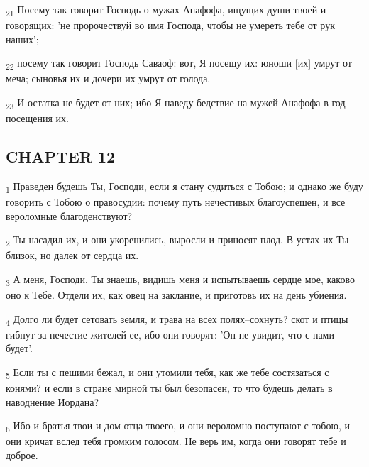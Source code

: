 \begin{tcolorbox}
\textsubscript{21} Посему так говорит Господь о мужах Анафофа, ищущих души твоей и говорящих: 'не пророчествуй во имя Господа, чтобы не умереть тебе от рук наших';
\end{tcolorbox}
\begin{tcolorbox}
\textsubscript{22} посему так говорит Господь Саваоф: вот, Я посещу их: юноши [их] умрут от меча; сыновья их и дочери их умрут от голода.
\end{tcolorbox}
\begin{tcolorbox}
\textsubscript{23} И остатка не будет от них; ибо Я наведу бедствие на мужей Анафофа в год посещения их.
\end{tcolorbox}
\subsection{CHAPTER 12}
\begin{tcolorbox}
\textsubscript{1} Праведен будешь Ты, Господи, если я стану судиться с Тобою; и однако же буду говорить с Тобою о правосудии: почему путь нечестивых благоуспешен, и все вероломные благоденствуют?
\end{tcolorbox}
\begin{tcolorbox}
\textsubscript{2} Ты насадил их, и они укоренились, выросли и приносят плод. В устах их Ты близок, но далек от сердца их.
\end{tcolorbox}
\begin{tcolorbox}
\textsubscript{3} А меня, Господи, Ты знаешь, видишь меня и испытываешь сердце мое, каково оно к Тебе. Отдели их, как овец на заклание, и приготовь их на день убиения.
\end{tcolorbox}
\begin{tcolorbox}
\textsubscript{4} Долго ли будет сетовать земля, и трава на всех полях--сохнуть? скот и птицы гибнут за нечестие жителей ее, ибо они говорят: 'Он не увидит, что с нами будет'.
\end{tcolorbox}
\begin{tcolorbox}
\textsubscript{5} Если ты с пешими бежал, и они утомили тебя, как же тебе состязаться с конями? и если в стране мирной ты был безопасен, то что будешь делать в наводнение Иордана?
\end{tcolorbox}
\begin{tcolorbox}
\textsubscript{6} Ибо и братья твои и дом отца твоего, и они вероломно поступают с тобою, и они кричат вслед тебя громким голосом. Не верь им, когда они говорят тебе и доброе.
\end{tcolorbox}
